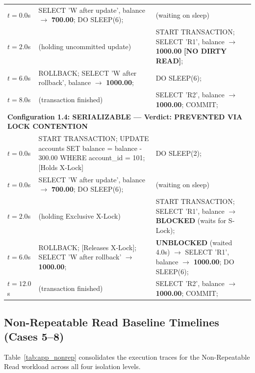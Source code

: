 \documentclass[sigconf, pbalance, nonacm]{acmart}
\begin{document}
\begin{table}[p]
\begin{tabularx}{\textwidth}{p{1.8cm} X X}
$t = 0.0$s & SELECT 'W after update', balance $\rightarrow$ \textbf{700.00}; DO SLEEP(6); & (waiting on sleep) \\
$t = 2.0$s & (holding uncommitted update) & START TRANSACTION; SELECT 'R1', balance $\rightarrow$ \textbf{1000.00} \textbf{[NO DIRTY READ]}; \\
$t = 6.0$s & ROLLBACK; SELECT 'W after rollback', balance $\rightarrow$ \textbf{1000.00}; & DO SLEEP(6); \\
$t = 8.0$s & (transaction finished) & SELECT 'R2', balance $\rightarrow$ \textbf{1000.00}; COMMIT; \\
\midrule
\multicolumn{3}{l}{\textbf{Configuration 1.4: SERIALIZABLE --- Verdict: PREVENTED VIA LOCK CONTENTION}} \\
$t = 0.0$s & START TRANSACTION; UPDATE accounts SET balance = balance - 300.00 WHERE account\_id = 101; [Holds X-Lock] & DO SLEEP(2); \\
$t = 0.0$s & SELECT 'W after update', balance $\rightarrow$ \textbf{700.00}; DO SLEEP(6); & (waiting on sleep) \\
$t = 2.0$s & (holding Exclusive X-Lock) & START TRANSACTION; SELECT 'R1', balance $\rightarrow$ \textbf{BLOCKED} (waits for S-Lock); \\
$t = 6.0$s & ROLLBACK; [Releases X-Lock]; SELECT 'W after rollback' $\rightarrow$ \textbf{1000.00}; & \textbf{UNBLOCKED} (waited 4.0s) $\rightarrow$ SELECT 'R1', balance $\rightarrow$ \textbf{1000.00}; DO SLEEP(6); \\
$t = 12.0$s & (transaction finished) & SELECT 'R2', balance $\rightarrow$ \textbf{1000.00}; COMMIT; \\
\bottomrule
\end{tabularx}
\end{table}

\subsection{Non-Repeatable Read Baseline Timelines (Cases 5--8)}
Table~\ref{tab:app_nonrep} consolidates the execution traces for the Non-Repeatable Read workload across all four isolation levels.
\end{document}
